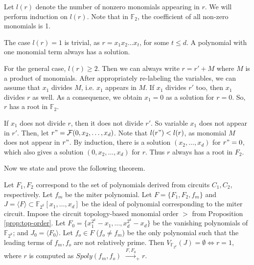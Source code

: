 \begin{Proof}
Let $l(r)$ denote the number of nonzero monomials appearing in $r$. We
will perform induction on $l(r)$. Note that in $\mathbb{F}_2$,
the coefficient of all non-zero monomials is 1.

The case $l(r)=1$ is trivial, as $r = x_1x_2\dots x_t$, for some $t
\leq d$. A polynomial with one monomial term always has a solution. 

For the general case, $l(r) \geq 2$. Then  we can always write $r =
r' + M$ where $M$ is a product of monomials. After appropriately
re-labeling the variables, we can assume that $x_1$ divides $M$,
i.e. $x_1$ appears in $M$. If $x_1$ divides $r'$ too, then $x_1$
divides $r$ as well. As a consequence, we obtain $x_1=0$ as a
solution for $r=0$. So, $r$ has a root in $\mathbb{F}_2$. 

If $x_1$ does not divide $r$, then it does not divide $r'$. So
variable $x_1$ does not appear in $r'$. Then, let $r"=\mathcal{F}(0,
x_2,\ldots, x_d)$. Note that $l(r") < l(r)$, as monomial $M$ does not
appear in $r"$. By induction, there is a solution $(x_2, \dots, x_d)$
for $r"=0$, which also gives a solution $(0, x_2, \ldots, x_d)$ for
$r$.  Thus $r$ always has a root in $F_2$.
\end{Proof}

Now we state and prove the following theorem.

\begin{Theorem}\label{thm:miter}
Let $F_1, F_2$ correspond to the set of polynomials
derived from circuits $C_1, C_2$, respectively. Let $f_m$ be the miter
polynomial. Let $F = \{F_1, F_2, f_m\}$ and $J=\langle F \rangle
\subset \mathbb{F}_{2^k}[x_{1},\dots,x_{d}]$ be the ideal of
polynomial corresponding to the miter circuit. Impose the circuit
topology-based monomial order $>$ from Proposition
\ref{prop:top-order}. Let $F_0 = \{ x_1^{2^k} - x_1, \dots,
x_d^{2^k} - x_d\}$ be the vanishing polynomials of $\mathbb{F}_{2^k}$;
and $J_0 = \langle F_0 \rangle$. Let $f_o \in F$ ($f_o \neq f_m$)
be the only polynomial such that  the leading terms of $f_m, f_o$ are
not relatively prime. Then $V_{\mathbb{F}_{2^k}}(J)=\emptyset \iff
r=1$, where $r$ is computed as  $Spoly(f_m, f_o)$
$\stackrel{F,F_0}{\longrightarrow}_+ r$. 

\end{Theorem}

